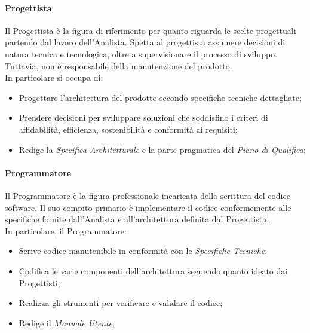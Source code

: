 \paragraph{Progettista}\label{progettista}Il Progettista è la figura di riferimento per quanto riguarda le scelte progettuali partendo dal lavoro dell'Analista. Spetta al progettista assumere decisioni di natura tecnica e tecnologica, oltre a supervisionare il processo di sviluppo. Tuttavia, non è responsabile della manutenzione del prodotto. \\
In particolare si occupa di:
\begin{itemize}
    \item Progettare l'architettura del prodotto secondo specifiche tecniche dettagliate;
    \item Prendere decisioni per sviluppare soluzioni che soddisfino i criteri di affidabilità, efficienza, sostenibilità e conformità ai requisiti;
    \item Redige la \textit{Specifica Architetturale} e la parte pragmatica del \textit{Piano di Qualifica};
\end{itemize}

\paragraph{Programmatore}
\label{par:programmatore}
Il Programmatore è la figura professionale incaricata della scrittura del codice software. Il suo compito primario è implementare il codice conformemente alle specifiche fornite dall'Analista e all'architettura definita dal Progettista. \\
In particolare, il Programmatore:
\begin{itemize}
    \item Scrive codice manutenibile in conformità con le \textit{Specifiche Tecniche};
    \item Codifica le varie componenti dell'architettura seguendo quanto ideato dai Progettisti;
    \item Realizza gli strumenti per verificare e validare il codice;
    \item Redige il \textit{Manuale Utente};
\end{itemize}

